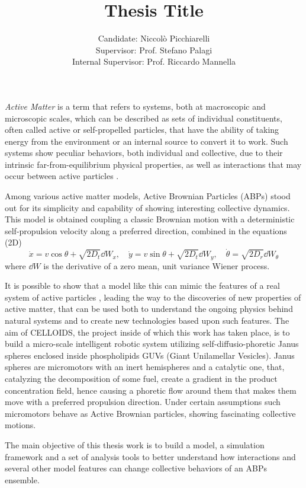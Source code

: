 \documentclass[a4paper, notitlepage]{report} %
\title{Thesis Title}
\author{Candidate: Niccolò Picchiarelli \\
Supervisor: Prof. Stefano Palagi\\
Internal Supervisor: Prof. Riccardo Mannella}
\begin{document}
	\vspace{-4cm}
	\maketitle
	\emph{Active Matter} is a term that refers to systems, both at macroscopic and microscopic scales, which can be described as sets of individual constituents, often called active or self-propelled particles, that have the ability of taking energy from the environment or an internal source to convert it to work. 
	Such systems show peculiar behaviors, both individual and collective, due to their intrinsic far-from-equilibrium physical properties, as well as interactions that may occur between active particles \cite{menon_active_2010, ramaswamy_active_2017}.
	
	Among various active matter models, Active Brownian Particles (ABPs) stood out for its simplicity and capability of showing interesting collective dynamics.
	This model is obtained coupling a classic Brownian motion with a deterministic self-propulsion velocity along a preferred direction, combined in the equations (2D)
	\begin{equation}
		\dot{x} = v \cos{\theta} + \sqrt{2D_t}\dd{W_x} , \quad \dot{y} = v \sin{\theta} + \sqrt{2D_t}\dd{W_y}, \quad \dot{\theta} = \sqrt{2D_r}\dd{W_{\theta}}
	\end{equation}
	where $\dd{W}$ is the derivative of a zero mean, unit variance Wiener process.
	
	It is possible to show that a model like this can mimic the features of a real system of active particles \citeauthor{bechinger_active_2016}, leading the way to the discoveries of new properties of active matter, that can be used both to understand the ongoing physics behind natural systems and to create new technologies based upon such features.
	The aim of CELLOIDS, the project inside of which this work has taken place, is to build a micro-scale intelligent robotic system utilizing self-diffusio-phoretic Janus spheres enclosed inside phospholipids GUVs (Giant Unilamellar Vesicles).
	Janus spheres are micromotors with an inert hemispheres and a catalytic one, that, catalyzing the decomposition of some fuel, create a gradient in the product concentration field, hence causing a phoretic flow around them that makes them move with a preferred propulsion direction.
	Under certain assumptions such micromotors behave as Active Brownian particles, showing fascinating collective motions.
	
	The main objective of this thesis work is to build a model, a simulation framework and a set of analysis tools to better understand how interactions and several other model features can change collective behaviors of an ABPs ensemble.
	
\end{document}
